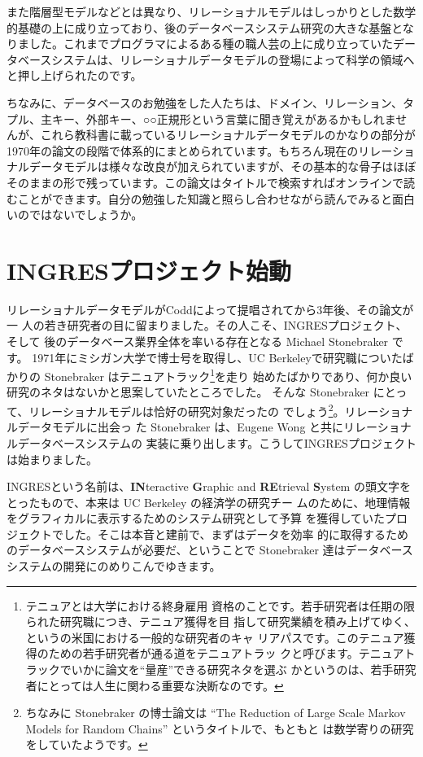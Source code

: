 また階層型モデルなどとは異なり、リレーショナルモデルはしっかりとした数学
的基礎の上に成り立っており、後のデータベースシステム研究の大きな基盤とな
りました。これまでプログラマによるある種の職人芸の上に成り立っていたデー
タベースシステムは、リレーショナルデータモデルの登場によって科学の領域へ
と押し上げられたのです。

ちなみに、データベースのお勉強をした人たちは、ドメイン、リレーション、タ
プル、主キー、外部キー、○○正規形という言葉に聞き覚えがあるかもしれませ
んが、これら教科書に載っているリレーショナルデータモデルのかなりの部分が
1970年の論文の段階で体系的にまとめられています。もちろん現在のリレーショ
ナルデータモデルは様々な改良が加えられていますが、その基本的な骨子はほぼ
そのままの形で残っています。この論文はタイトルで検索すればオンラインで読
むことができます。自分の勉強した知識と照らし合わせながら読んでみると面白
いのではないでしょうか。

\section{INGRESプロジェクト始動}

リレーショナルデータモデルがCoddによって提唱されてから3年後、その論文が一
人の若き研究者の目に留まりました。その人こそ、INGRESプロジェクト、そして
後のデータベース業界全体を率いる存在となる Michael Stonebraker です。
1971年にミシガン大学で博士号を取得し、UC Berkeleyで研究職についたばかりの
Stonebraker はテニュアトラック\footnote{テニュアとは大学における終身雇用
資格のことです。若手研究者は任期の限られた研究職につき、テニュア獲得を目
指して研究業績を積み上げてゆく、というの米国における一般的な研究者のキャ
リアパスです。このテニュア獲得のための若手研究者が通る道をテニュアトラッ
クと呼びます。テニュアトラックでいかに論文を``量産''できる研究ネタを選ぶ
かというのは、若手研究者にとっては人生に関わる重要な決断なのです。}を走り
始めたばかりであり、何か良い研究のネタはないかと思案していたところでした。
そんな Stonebraker にとって、リレーショナルモデルは恰好の研究対象だったの
でしょう\footnote{ちなみに Stonebraker の博士論文は ``The Reduction of
Large Scale Markov Models for Random Chains'' というタイトルで、もともと
は数学寄りの研究をしていたようです。 }。リレーショナルデータモデルに出会っ
た Stonebraker は、Eugene Wong と共にリレーショナルデータベースシステムの
実装に乗り出します。こうしてINGRESプロジェクトは始まりました。


INGRESという名前は、{\bf IN}teractive {\bf G}raphic and {\bf RE}trieval
{\bf S}ystem の頭文字をとったもので、本来は UC Berkeley の経済学の研究チー
ムのために、地理情報をグラフィカルに表示するためのシステム研究として予算
を獲得していたプロジェクトでした。そこは本音と建前で、まずはデータを効率
的に取得するためのデータベースシステムが必要だ、ということで Stonebraker
達はデータベースシステムの開発にのめりこんでゆきます。



